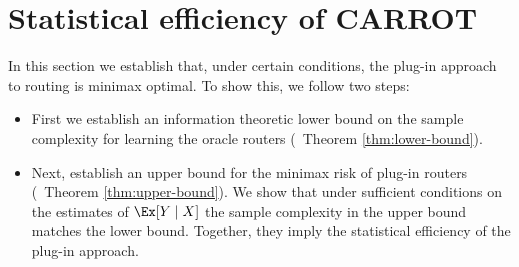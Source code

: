 \section{Statistical efficiency of CARROT} 
\label{sec:lower-bound}

In this section we establish that, under certain conditions, the plug-in approach to routing is minimax optimal. To show this, we follow two steps:
\begin{itemize}
    \item First we establish an information theoretic lower bound on the sample complexity for learning the oracle routers (\cf\ Theorem \ref{thm:lower-bound}). 
    \item Next, establish an upper bound for the minimax risk of plug-in routers (\cf\ Theorem \ref{thm:upper-bound}). We show that under sufficient conditions on the estimates of $\Ex[Y\mid X]$ the sample complexity in the upper bound matches the lower bound. Together, they imply the statistical efficiency of the plug-in approach.  
\end{itemize} 




